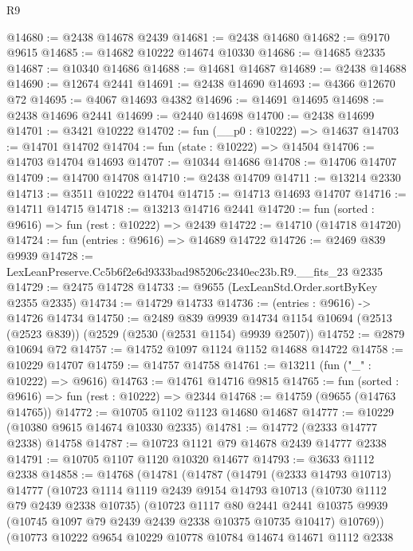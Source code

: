 \begin{lexlean}{R9}
\begin{coremodule}
@14680 := @2438 @14678 @2439
@14681 := @2438 @14680
@14682 := @9170 @9615
@14685 := @14682 @10222 @14674 @10330
@14686 := @14685 @2335
@14687 := @10340 @14686
@14688 := @14681 @14687
@14689 := @2438 @14688
@14690 := @12674 @2441
@14691 := @2438 @14690
@14693 := @4366 @12670 @72
@14695 := @4067 @14693 @4382
@14696 := @14691 @14695
@14698 := @2438 @14696 @2441
@14699 := @2440 @14698
@14700 := @2438 @14699
@14701 := @3421 @10222
@14702 := fun (__p0 : @10222) => @14637
@14703 := @14701 @14702
@14704 := fun (state : @10222) => @14504
@14706 := @14703 @14704 @14693
@14707 := @10344 @14686
@14708 := @14706 @14707
@14709 := @14700 @14708
@14710 := @2438 @14709
@14711 := @13214 @2330
@14713 := @3511 @10222 @14704
@14715 := @14713 @14693 @14707
@14716 := @14711 @14715
@14718 := @13213 @14716 @2441
@14720 := fun (sorted : @9616) => fun (rest : @10222) => @2439
@14722 := @14710 (@14718 @14720)
@14724 := fun (entries : @9616) => @14689 @14722
@14726 := @2469 @839 @9939
@14728 := LexLeanPreserve.Cc5b6f2e6d9333bad985206c2340ec23b.R9.__fits_23 @2335
@14729 := @2475 @14728
@14733 := @9655 (LexLeanStd.Order.sortByKey @2355 @2335)
@14734 := @14729 @14733
@14736 := (entries : @9616) -> @14726 @14734
@14750 := @2489
    @839
    @9939
    @14734
    @1154
    @10694
    (@2513 (@2523 @839))
    (@2529 (@2530 (@2531 @1154) @9939 @2507))
@14752 := @2879 @10694 @72
@14757 := @14752 @1097 @1124 @1152 @14688 @14722
@14758 := @10229 @14707
@14759 := @14757 @14758
@14761 := @13211 (fun ("_" : @10222) => @9616)
@14763 := @14761 @14716 @9815
@14765 := fun (sorted : @9616) => fun (rest : @10222) => @2344
@14768 := @14759 (@9655 (@14763 @14765))
@14772 := @10705 @1102 @1123 @14680 @14687
@14777 := @10229 (@10380 @9615 @14674 @10330 @2335)
@14781 := @14772 (@2333 @14777 @2338) @14758
@14787 := @10723 @1121 @79 @14678 @2439 @14777 @2338
@14791 := @10705 @1107 @1120 @10320 @14677
@14793 := @3633 @1112 @2338
@14858 := @14768
    (@14781
      (@14787
        (@14791
          (@2333 @14793 @10713)
          @14777
          (@10723
            @1114
            @1119
            @2439
            @9154
            @14793
            @10713
            (@10730 @1112 @79 @2439 @2338 @10735)
            (@10723
              @1117
              @80
              @2441
              @2441
              @10375
              @9939
              (@10745 @1097 @79 @2439 @2439 @2338 @10375 @10735 @10417)
              @10769))
          (@10773
            @10222
            @9654
            @10229
            @10778
            @10784
            @14674
            @14671
            @1112
            @2338

\end{coremodule}
\end{lexlean}

